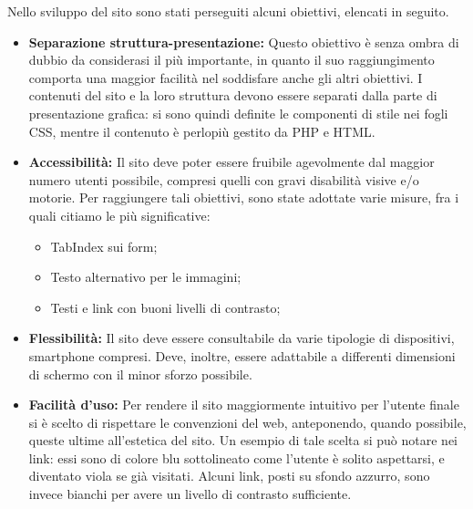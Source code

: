 Nello sviluppo del sito sono stati perseguiti alcuni obiettivi, elencati in seguito.

\begin{itemize}
	\item \textbf{Separazione struttura-presentazione:} Questo obiettivo è senza ombra di dubbio da considerasi il più importante, in quanto il suo raggiungimento comporta una maggior facilità nel soddisfare anche gli altri obiettivi. I contenuti del sito e la loro struttura devono essere separati dalla parte di presentazione grafica: si sono quindi definite le componenti di stile nei fogli CSS, mentre il contenuto è perlopiù gestito da PHP e HTML.
	
	\item \textbf{Accessibilità: } Il sito deve poter essere fruibile agevolmente dal maggior numero utenti possibile, compresi quelli con gravi disabilità visive e/o motorie. Per raggiungere tali obiettivi, sono state adottate varie misure, fra i quali citiamo le più significative:
	\begin{itemize}
		\item TabIndex sui form;
		\item Testo alternativo per le immagini;
		\item Testi e link con buoni livelli di contrasto;
	\end{itemize}
	
	\item \textbf{Flessibilità:} Il sito deve essere consultabile da varie tipologie di dispositivi, smartphone compresi. Deve, inoltre, essere adattabile a differenti dimensioni di schermo con il minor sforzo possibile.
	
	\item \textbf{Facilità d'uso:} Per rendere il sito maggiormente intuitivo per l'utente finale si è scelto di rispettare le convenzioni del web, anteponendo, quando possibile, queste ultime all'estetica del sito. Un esempio di tale scelta si può notare nei link: essi sono di colore blu sottolineato come l'utente è solito aspettarsi, e diventato viola se già visitati. Alcuni link, posti su sfondo azzurro, sono invece bianchi per avere un livello di contrasto sufficiente.
\end{itemize}